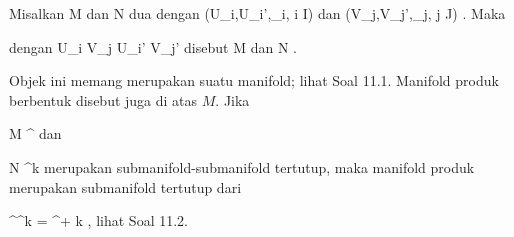 \setcounter{section}{11}


{}
{

Misalkan
\mathkor {} {M} {dan} {N} {}
dua
dengan
\mathkor {} {(U_i,U_i',\alpha_i, i \in I)} {dan} {(V_j,V_j',\beta_j, j \in J)} {.}
Maka

 dengan
 {U_i \times V_j } { U_i' \times V_j'
} {}
 {} {}
disebut 
\mathkor {} {M} {dan} {N} {.}

}

Objek ini memang merupakan suatu manifold; lihat
Soal 11.1.
Manifold produk berbentuk
 disebut juga  {} di atas $M$. Jika

\mavergleichskette
{\vergleichskette
{ M
}
{ \subseteq }{ \R^\ell
}
{  }{
}
{    }{
}
{   }{
}
}
{}{}{}
dan

\mavergleichskette
{\vergleichskette
{ N
}
{ \subseteq }{ \R^k
}
{  }{
}
{    }{
}
{   }{
}
}
{}{}{}
merupakan submanifold-submanifold tertutup, maka manifold produk
 merupakan submanifold tertutup dari

\mavergleichskette
{\vergleichskette
{ \R^\ell \times \R^k
}
{ = }{ \R^{\ell + k}
}
{  }{
}
{    }{
}
{   }{
}
}
{}{}{,}
lihat
Soal 11.2.



